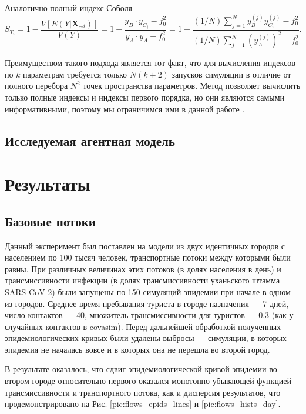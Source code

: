 \documentclass[a4paper,12pt]{article} %
\begin{document}
\begin{itemize}
Аналогично полный индекс Соболя
\begin{displaymath}
S_{T_i}=1-\frac{V[E(Y|\bm{X}_{\sim i})]}{V(Y)}=1-\frac{y_B\cdot y_{C_i}-f_0^2}{y_A\cdot y_A -f_0^2}=1-\frac{(1/N)\sum_{j=1}^N y_B^{(j)}y_{C_i}^{(j)} - f_0^2}{(1/N)\sum_{j=1}^N (y_A^{(j)})^2 - f_0^2}.
\end{displaymath}
\end{itemize}

Преимуществом такого подхода является тот факт, что для вычисления индексов по $k$ параметрам требуется только $N(k+2)$ запусков симуляции в отличие от полного перебора $N^2$ точек пространства параметров. Метод позволяет вычислить только полные индексы и индексы первого порядка, но они являются самыми информативными, поэтому мы ограничимся ими в данной работе \cite{saltelli2008global}.


\subsection{Исследуемая агентная модель}
\section{Результаты}

\subsection{Базовые потоки}
Данный эксперимент был поставлен на модели из двух идентичных городов с населением по 100 тысяч человек, транспортные потоки между которыми были равны. При различных величинах этих потоков (в долях населения в день) и трансмиссивности инфекции (в долях трансмиссивности уханьского штамма SARS-CoV-2) были запущены по 150 симуляций эпидемии при начале в одном из городов. Среднее время пребывания туриста в городе назначения --- 7 дней, число контактов --- 40, множитель трансмиссивности для туристов --- 0.3 (как у случайных контактов в \gls{covasim}). Перед дальнейшей обработкой полученных эпидемиологических кривых были удалены выбросы --- симуляции, в которых эпидемия не началась вовсе и в которых она не перешла во второй город. 

В результате оказалось, что сдвиг эпидемиологической кривой эпидемии во втором городе относительно первого оказался монотонно убывающей функцией трансмиссивности и транспортного потока, как и дисперсия результатов, что продемонстрировано на Рис. \ref{pic:flows_epids_lines} и \ref{pic:flows_hists_day}.
\end{document}
